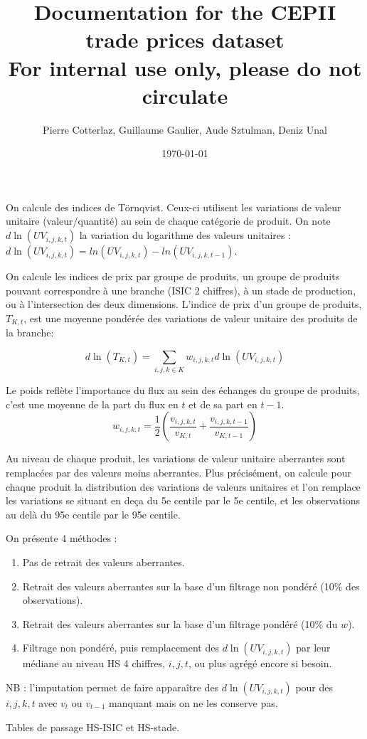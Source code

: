 \documentclass[12pt]{article}
\title{Documentation for the CEPII trade prices dataset \\
\small{For internal use only, please do not circulate}}
\author{Pierre Cotterlaz, Guillaume Gaulier, Aude Sztulman, Deniz Unal}
\date{\today}
\begin{document}
\maketitle

On calcule des indices de Törnqvist. Ceux-ci utilisent les variations de valeur unitaire (valeur/quantité) au sein de chaque catégorie de produit. On note $d\ln(UV_{i,j,k,t})$ la variation du logarithme des valeurs unitaires : $d\ln(UV_{i,j,k,t}) = ln(UV_{i,j,k,t}) - ln(UV_{i,j,k,t-1})$. 

On calcule les indices de prix par groupe de produits, un groupe de produits pouvant correspondre à une branche (ISIC 2 chiffres), à un stade de production, ou à l'intersection des deux dimensions. L'indice de prix d'un groupe de produits, $T_{K,t}$, est une moyenne pondérée des variations de valeur unitaire des produits de la branche: 

\begin{equation*}
    d\ln(T_{K,t}) = \sum_{i,j,k \in K} w_{i,j,k,t} d\ln(UV_{i,j,k,t})
\end{equation*}

Le poids reflète l'importance du flux au sein des échanges du groupe de produits, c'est une moyenne de la part du flux en $t$ et de sa part en $t-1$. 
$$w_{i,j,k,t} = \frac{1}{2} \left( \frac{v_{i,j,k,t}}{v_{K,t}} + \frac{v_{i,j,k,t-1}}{v_{K,t-1}}  \right)$$

Au niveau de chaque produit, les variations de valeur unitaire aberrantes sont remplacées par des valeurs moins aberrantes. Plus précisément, on calcule pour chaque produit la distribution des variations de valeurs unitaires et l'on remplace les variations se situant en deça du 5e centile par le 5e centile, et les observations au delà du 95e centile par le 95e centile.

On présente 4 méthodes : 

\begin{enumerate}
\item Pas de retrait des valeurs aberrantes.
\item Retrait des valeurs aberrantes sur la base d'un filtrage non pondéré (10\% des observations).
\item Retrait des valeurs aberrantes sur la base d'un filtrage pondéré (10\% du $w$).
\item Filtrage non pondéré, puis remplacement des $d\ln(UV_{i,j,k,t})$ par leur médiane au niveau HS 4 chiffres, $i,j,t$, ou plus agrégé encore si besoin.  
\end{enumerate}

NB : l'imputation permet de faire apparaître des $d\ln(UV_{i,j,k,t})$ pour des $i,j,k,t$ avec $v_t$ ou $v_{t-1}$ manquant mais on ne les conserve pas.

Tables de passage HS-ISIC et HS-stade.
\end{document}
